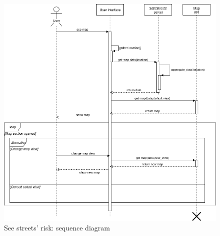\documentclass{article}
\begin{document}
	\begin{figure}[H]
			\includegraphics[width=\linewidth]{Images/Map_statistics_sequence_diagram.png}
			\caption{See streets' risk: sequence diagram}
	\end{figure}
		
\end{document}
